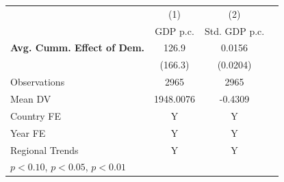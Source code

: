 \begin{tabular}{l*{3}{c}}
\hline
            &\multicolumn{1}{c}{(1)}&\multicolumn{1}{c}{(2)}\\
            &\multicolumn{1}{c}{GDP p.c.}&\multicolumn{1}{c}{Std. GDP p.c.}\\
\hline
\textbf{Avg. Cumm. Effect of Dem.}&       126.9         &      0.0156         \\
            &     (166.3)         &    (0.0204)         \\
\midrule
Observations&        2965         &        2965         \\
Mean DV     &   1948.0076         &     -0.4309         \\
Country FE  &           Y         &           Y         \\
Year FE     &           Y         &           Y         \\
Regional Trends&           Y         &           Y         \\
\hline
\multicolumn{3}{l}{\footnotesize \sym{*} \(p<0.10\), \sym{**} \(p<0.05\), \sym{***} \(p<0.01\)}\\
\end{tabular}
